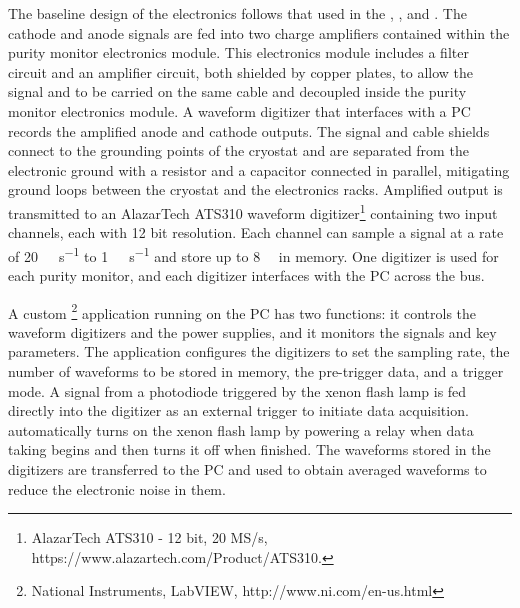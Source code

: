 The baseline design of the  electronics follows that used in %
the ,  , and . The cathode and anode signals are fed into two charge amplifiers contained within the purity monitor electronics module.
This electronics module includes a  filter circuit and an amplifier circuit, both shielded by copper plates, to allow the signal and  to be carried on the same cable and decoupled inside the purity monitor electronics module. 
A waveform digitizer that interfaces with a  PC records the amplified anode and cathode outputs. 
The signal and  cable shields connect to the grounding points of the cryostat and are separated from the electronic ground with a resistor and a capacitor connected in parallel, mitigating ground loops between the cryostat and the electronics racks. Amplified output is transmitted to an AlazarTech ATS310 waveform digitizer\footnote{AlazarTech ATS310\texttrademark{} - 12 bit, 20 MS/s,  https://www.alazartech.com/Product/ATS310.} containing two input channels, each with 12 bit resolution. Each channel can sample a signal at a rate of \SI{20}{\mega\samples\per\second} to \SI{1}{\kilo\samples\per\second} and store up to \SI{8}{\mega\samples} in memory. One digitizer is used for each purity monitor, and each digitizer interfaces with the  PC across the  bus. 

A custom \footnote{National Instruments, LabVIEW\texttrademark{}, http://www.ni.com/en-us.html} application running on the  PC has two functions: it controls the waveform digitizers and the power supplies, and it monitors the signals and key parameters. The application configures the digitizers to set the sampling rate, the number of waveforms to be stored in memory, the pre-trigger data, and a trigger mode. A signal from a photodiode triggered by the xenon flash lamp is fed directly into the digitizer as an external trigger to initiate data acquisition.    automatically turns on the xenon flash lamp by powering a relay when data taking begins and then turns it off when finished.
The waveforms stored in the digitizers are transferred to the  PC and used to obtain averaged waveforms to reduce the electronic noise in them. %

